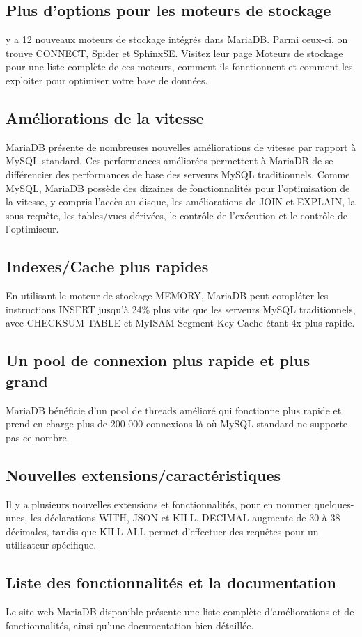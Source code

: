 \subsection{Plus d'options pour les moteurs de stockage \cite{mysql-maria}}
 y a 12 nouveaux moteurs de stockage intégrés dans MariaDB. Parmi ceux-ci, on trouve CONNECT, Spider et SphinxSE. Visitez leur page Moteurs de stockage pour une liste complète de ces moteurs, comment ils fonctionnent et comment les exploiter pour optimiser votre base de données.
\subsection{Améliorations de la vitesse \cite{mysql-maria}}
MariaDB présente de nombreuses nouvelles améliorations de vitesse par rapport à MySQL standard. Ces performances améliorées permettent à MariaDB de se différencier des performances de base des serveurs MySQL traditionnels. Comme MySQL, MariaDB possède des dizaines de fonctionnalités pour l'optimisation de la vitesse, y compris l'accès au disque, les améliorations de JOIN et EXPLAIN, la sous-requête, les tables/vues dérivées, le contrôle de l'exécution et le contrôle de l'optimiseur.
\subsection{Indexes/Cache plus rapides \cite{mysql-maria}}
En utilisant le moteur de stockage MEMORY, MariaDB peut compléter les instructions INSERT jusqu'à 24\% plus vite que les serveurs MySQL traditionnels, avec CHECKSUM TABLE et MyISAM Segment Key Cache étant 4x plus rapide.
\subsection{Un pool de connexion plus rapide et plus grand \cite{mysql-maria}}
MariaDB bénéficie d'un pool de threads amélioré qui fonctionne plus rapide et prend en charge plus de 200 000 connexions là où MySQL standard ne supporte pas ce nombre.
\subsection{Nouvelles extensions/caractéristiques \cite{mysql-maria}}
Il y a plusieurs nouvelles extensions et fonctionnalités, pour en nommer quelques-unes, les déclarations WITH, JSON et KILL. DECIMAL augmente de 30 à 38 décimales, tandis que KILL ALL permet d'effectuer des requêtes pour un utilisateur spécifique.
\subsection{Liste des fonctionnalités et la documentation \cite{mysql-maria}}
Le site web MariaDB disponible présente une liste complète d'améliorations et de fonctionnalités, ainsi qu’une documentation bien détaillée.
